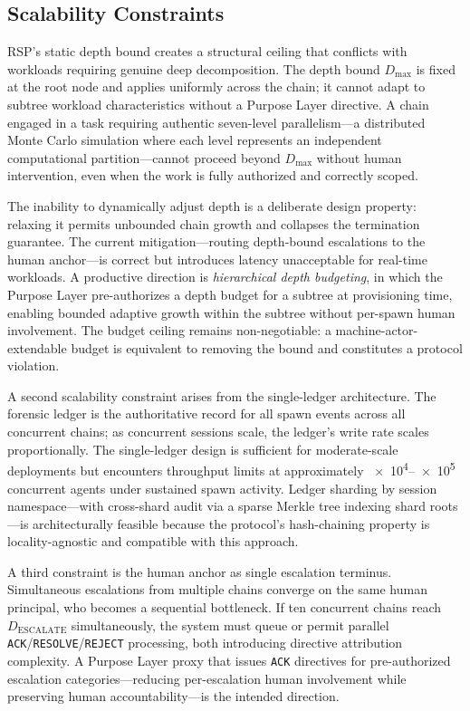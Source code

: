 \subsection{Scalability Constraints}
\label{sec:rs-scalability}

RSP's static depth bound creates a structural ceiling that conflicts with workloads requiring genuine deep decomposition. The depth bound $D_{\max}$ is fixed at the root node and applies uniformly across the chain; it cannot adapt to subtree workload characteristics without a Purpose Layer directive. A chain engaged in a task requiring authentic seven-level parallelism---a distributed Monte Carlo simulation where each level represents an independent computational partition---cannot proceed beyond $D_{\max}$ without human intervention, even when the work is fully authorized and correctly scoped.

The inability to dynamically adjust depth is a deliberate design property: relaxing it permits unbounded chain growth and collapses the termination guarantee. The current mitigation---routing depth-bound escalations to the human anchor---is correct but introduces latency unacceptable for real-time workloads. A productive direction is \emph{hierarchical depth budgeting}, in which the Purpose Layer pre-authorizes a depth budget for a subtree at provisioning time, enabling bounded adaptive growth within the subtree without per-spawn human involvement. The budget ceiling remains non-negotiable: a machine-actor-extendable budget is equivalent to removing the bound and constitutes a protocol violation.

A second scalability constraint arises from the single-ledger architecture. The forensic ledger is the authoritative record for all spawn events across all concurrent chains; as concurrent sessions scale, the ledger's write rate scales proportionally. The single-ledger design is sufficient for moderate-scale deployments but encounters throughput limits at approximately \numrange{e4}{e5} concurrent agents under sustained spawn activity. Ledger sharding by session namespace---with cross-shard audit via a sparse Merkle tree indexing shard roots---is architecturally feasible because the protocol's hash-chaining property is locality-agnostic and compatible with this approach.

A third constraint is the human anchor as single escalation terminus. Simultaneous escalations from multiple chains converge on the same human principal, who becomes a sequential bottleneck. If ten concurrent chains reach $D_{\text{ESCALATE}}$ simultaneously, the system must queue or permit parallel \texttt{ACK}/\texttt{RESOLVE}/\texttt{REJECT} processing, both introducing directive attribution complexity. A Purpose Layer proxy that issues \texttt{ACK} directives for pre-authorized escalation categories---reducing per-escalation human involvement while preserving human accountability---is the intended direction.

